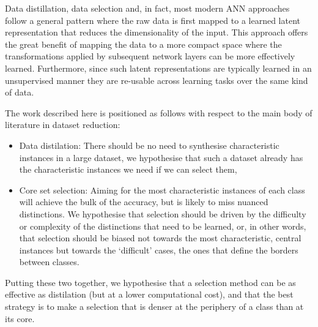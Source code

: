 Data distillation, data selection and, in fact, most modern ANN
approaches follow a general pattern where the raw data is first mapped
to a learned latent representation that reduces the dimensionality of
the input. This approach offers the great benefit of mapping the data
to a more compact space where the transformations
applied by subsequent network layers can be more effectively learned.
Furthermore, since such latent representations are typically learned
in an unsupervised manner they are re-usable across learning tasks
over the same kind of data.

The work described here is positioned as follows with respect to the main
body of literature in dataset reduction:
%
\begin{itemize}

\item Data distilation: There should be no need to synthesise
  characteristic instances in a large dataset, we hypothesise that
  such a dataset already has the characteristic instances we need if
  we can select them,
\item Core set selection: Aiming for the most characteristic instances
  of each class will achieve the bulk of the accuracy, but is likely
  to miss nuanced distinctions. We hypothesise that selection should
  be driven by the difficulty or complexity of the distinctions that
  need to be learned, or, in other words, that selection should be
  biased not towards the most characteristic, central instances but
  towards the `difficult' cases, the ones that define the borders
  between classes.
\end{itemize}
%
Putting these two together, we hypothesise that a selection method can
be as effective as distilation (but at a lower computational cost),
and that the best strategy is to make a selection that is denser at
the periphery of a class than at its core.

